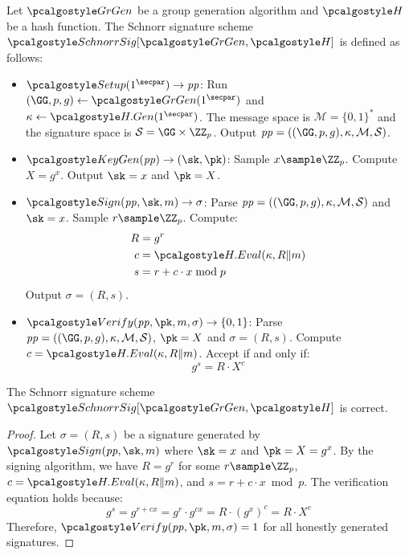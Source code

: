 \begin{definition}\label{def:schnorr}
  Let $\grgen$ be a group generation algorithm and $\algo{H}$ be a hash function. The Schnorr signature scheme $\algo{SchnorrSig}[\grgen, \algo{H}]$ is defined as follows:
  \begin{itemize}
    \item $\algo{Setup}(1^\secpar) \rightarrow \params$: Run $\gparam \gets \grgen(1^\secpar)$ and $\kappa \gets \algo{H.Gen}(1^\secpar)$. The message space is $\mathcal{M} = \{0,1\}^*$ and the signature space is $\mathcal{S} = \GG \times \ZZ_p$. Output $\params = (\gparam, \kappa, \mathcal{M}, \mathcal{S})$.
    
    \item $\algo{KeyGen}(\params) \rightarrow (\sk, \pk)$: Sample $x \sample \ZZ_p$. Compute $X = g^x$. Output $\sk = x$ and $\pk = X$.
    
    \item $\algo{Sign}(\params, \sk, m) \rightarrow \sigma$: Parse $\params = (\gparam, \kappa, \mathcal{M}, \mathcal{S})$ and $\sk = x$. Sample $r \sample \ZZ_p$. Compute:
    \begin{align*}
      R &= g^r \\
      c &= \algo{H.Eval}(\kappa, R \| m) \\
      s &= r + c \cdot x \bmod p
    \end{align*}
    Output $\sigma = (R, s)$.
    
    \item $\algo{Verify}(\params, \pk, m, \sigma) \rightarrow \{0, 1\}$: Parse $\params = (\gparam, \kappa, \mathcal{M}, \mathcal{S})$, $\pk = X$ and $\sigma = (R, s)$. Compute $c = \algo{H.Eval}(\kappa, R \| m)$. Accept if and only if:
    \[
      g^s = R \cdot X^c
    \]
  \end{itemize}
\end{definition}

\begin{lemma}\label{lem:schnorr-correctness}
  The Schnorr signature scheme\\ $\algo{SchnorrSig}[\grgen, \algo{H}]$ is correct.
\end{lemma}

\begin{proof}
  Let $\sigma = (R, s)$ be a signature generated by $\algo{Sign}(\params, \sk, m)$ where $\sk = x$ and $\pk = X = g^x$. By the signing algorithm, we have $R = g^r$ for some $r \sample \ZZ_p$, $c = \algo{H.Eval}(\kappa, R \| m)$, and $s = r + c \cdot x \bmod p$. The verification equation holds because:
  \[
    g^s = g^{r + cx} = g^r \cdot g^{cx} = R \cdot (g^x)^c = R \cdot X^c
  \]
  Therefore, $\algo{Verify}(\params, \pk, m, \sigma) = 1$ for all honestly generated signatures.
\end{proof}

